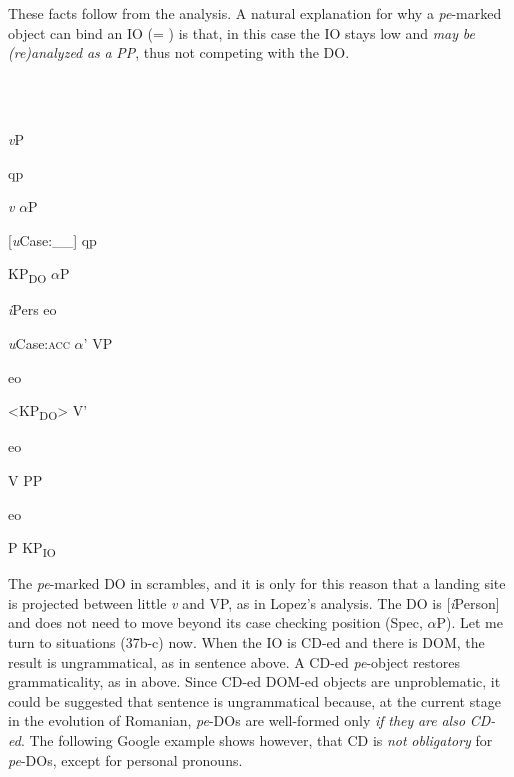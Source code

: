 \documentclass[output=paper,colorlinks,citecolor=brown]{./langscibook}
\begin{document}
These facts follow from the analysis. A natural explanation for why a \textit{pe}{}-marked object can bind an IO (= ) is that, in this case the IO stays low and \textit{may} \textit{be} \textit{(re)analyzed} \textit{as} \textit{a} \textit{PP}, thus not competing with the DO. 

\ea%
    \label{ex:key:38}
    \gll\\
        \\
    \glt
    \z

            \textit{v}P

         qp

\textit{v}            ${\alpha}$P

  [\textit{u}Case:\_\_]     qp

      KP\textsubscript{DO}      ${\alpha}$P

      \textit{i}Pers    eo

      \textit{u}Case:\textsc{acc}  ${\alpha}$’      VP

            eo

            <KP\textsubscript{DO}>         V’

              eo

                     V    PP

                 eo

                       P    KP\textsubscript{IO}

The \textit{pe}{}-marked DO in  scrambles, and it is only for this reason that a landing site is projected between little \textit{v} and VP, as in Lopez’s analysis. The DO is [\textit{i}Person] and does not need to move beyond its case checking position (Spec, ${\alpha}$P). Let me turn to situations (37b-c) now. When the IO is CD-ed and there is DOM, the result is ungrammatical, as in sentence  above. A CD-ed \textit{pe}{}-object restores grammaticality, as in  above. Since CD-ed DOM-ed objects are unproblematic, it could be suggested that sentence  is ungrammatical because, at the current stage in the evolution of Romanian, \textit{pe}{}-DOs are well-formed only \textit{if} \textit{they} \textit{are} \textit{also} \textit{CD-ed}. The following Google example shows however, that CD is \textit{not} \textit{obligatory} for \textit{pe}{}-DOs, except for personal pronouns.

\ea%
    \label{ex:key:39}
    \gll\\
        \\
    \glt
    \z
\end{document}
